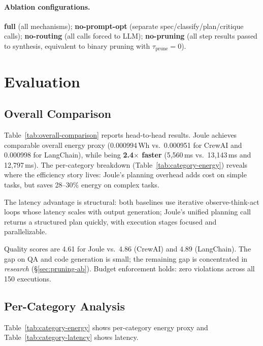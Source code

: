 \documentclass[sigconf,authordraft]{acmart}
\begin{document}
\paragraph{Ablation configurations.}
\textbf{full} (all mechanisms); \textbf{no-prompt-opt} (separate spec/classify/plan/critique calls); \textbf{no-routing} (all calls forced to LLM); \textbf{no-pruning} (all step results passed to synthesis, equivalent to binary pruning with $\tau_{\text{prune}} = 0$).

\section{Evaluation}
\label{sec:eval}

\subsection{Overall Comparison}
\label{sec:overall}



Table~\ref{tab:overall-comparison} reports head-to-head results.
Joule achieves comparable overall energy proxy (0.000994\,Wh vs.\ 0.000951 for CrewAI and 0.000998 for LangChain), while being \textbf{2.4$\times$ faster} (5,560\,ms vs.\ 13,143\,ms and 12,797\,ms).
The per-category breakdown (Table~\ref{tab:category-energy}) reveals where the efficiency story lives: Joule's planning overhead adds cost on simple tasks, but saves 28--30\% energy on complex tasks.

The latency advantage is structural: both baselines use iterative observe-think-act loops whose latency scales with output generation; Joule's unified planning call returns a structured plan quickly, with execution stages focused and parallelizable.

Quality scores are 4.61 for Joule vs.\ 4.86 (CrewAI) and 4.89 (LangChain).
The gap on QA and code generation is small; the remaining gap is concentrated in \emph{research} (\S\ref{sec:pruning-ab}).
Budget enforcement holds: zero violations across all 150 executions.

\subsection{Per-Category Analysis}
\label{sec:percategory}

Table~\ref{tab:category-energy} shows per-category energy proxy and Table~\ref{tab:category-latency} shows latency.
\end{document}
